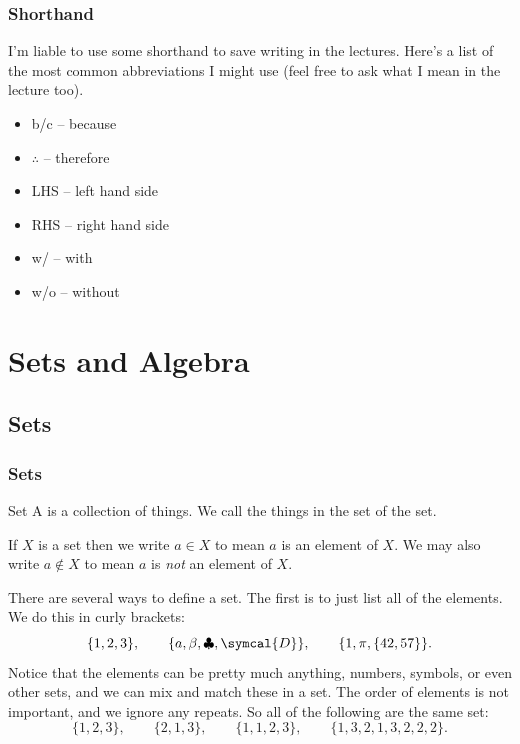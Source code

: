 \documentclass[fleqn]{LectureClass/LectureClass}
\begin{document}
    \section{Shorthand}
    I'm liable to use some shorthand to save writing in the lectures.
    Here's a list of the most common abbreviations I might use (feel free to ask what I mean in the lecture too).
    \begin{itemize}
        \item b/c -- because
        \item \(\therefore\) -- therefore
        \item LHS -- left hand side
        \item RHS -- right hand side
        \item w/ -- with
        \item w/o -- without
    \end{itemize}
    
    \part{Sets and Algebra}
    \chapter{Sets}
    \section{Sets}
    \begin{dfn}{Set}{}
        A  is a collection of things.
        We call the things in the set  of the set.
    \end{dfn}
    
    \begin{ntn}{}{}
        If \(X\) is a set then we write \(a \in X\) to mean \(a\) is an element of \(X\).
        We may also write \(a \notin X\) to mean \(a\) is \emph{not} an element of \(X\).
    \end{ntn}
    
    There are several ways to define a set.
    The first is to just list all of the elements.
    We do this in curly brackets:
    \begin{equation}
        \{1, 2, 3\}, \qquad \{a, \beta, \clubsuit, \symcal{D}\}, \qquad \{1, \pi, \{42, 57\}\}.
    \end{equation}
    Notice that the elements can be pretty much anything, numbers, symbols, or even other sets, and we can mix and match these in a set.
    The order of elements is not important, and we ignore any repeats.
    So all of the following are the same set:
    \begin{equation}
        \{1, 2, 3\}, \qquad \{2, 1, 3\}, \qquad \{1, 1, 2, 3\}, \qquad \{1, 3, 2, 1, 3, 2, 2, 2\}.
    \end{equation}
    
\end{document}
